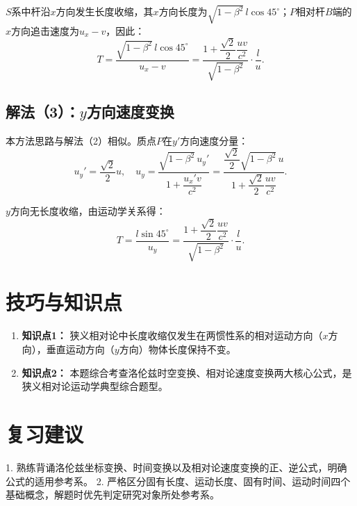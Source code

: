 \documentclass[11pt,a4paper]{ctexart}
\begin{document}
$S$系中杆沿$x$方向发生长度收缩，其$x$方向长度为$\sqrt{1-\beta^2}\,l\cos45^\circ$；$P$相对杆$B$端的$x$方向追击速度为$u_x-v$，因此：
\[
T = \frac{\sqrt{1-\beta^2}\,l\cos45^\circ}{u_x - v}
= \frac{1 + \dfrac{\sqrt{2}}{2}\dfrac{uv}{c^2}}{\sqrt{1-\beta^2}}\cdot\frac{l}{u}.
\]

\subsection*{解法（3）：$y$方向速度变换}
本方法思路与解法（2）相似。质点$P$在$y'$方向速度分量：
\[
u_y' = \frac{\sqrt{2}}{2}u,\quad
u_y = \frac{\sqrt{1-\beta^2}\,u_y'}{1 + \dfrac{u_x'v}{c^2}}
= \frac{\dfrac{\sqrt{2}}{2}\sqrt{1-\beta^2}\,u}{1 + \dfrac{\sqrt{2}}{2}\dfrac{uv}{c^2}}.
\]

$y$方向无长度收缩，由运动学关系得：
\[
T = \frac{l\sin45^\circ}{u_y}
= \frac{1 + \dfrac{\sqrt{2}}{2}\dfrac{uv}{c^2}}{\sqrt{1-\beta^2}}\cdot\frac{l}{u}.
\]

\section*{技巧与知识点}

\begin{tipBox}
\begin{enumerate}
  \item \textbf{知识点1：} 狭义相对论中长度收缩仅发生在两惯性系的相对运动方向（$x$方向），垂直运动方向（$y$方向）物体长度保持不变。
  \item \textbf{知识点2：} 本题综合考查洛伦兹时空变换、相对论速度变换两大核心公式，是狭义相对论运动学典型综合题型。
\end{enumerate}
\end{tipBox}

\section*{复习建议}

1. 熟练背诵洛伦兹坐标变换、时间变换以及相对论速度变换的正、逆公式，明确公式的适用参考系。
2. 严格区分固有长度、运动长度、固有时间、运动时间四个基础概念，解题时优先判定研究对象所处参考系。
\end{document}
